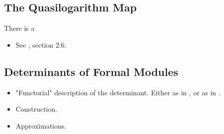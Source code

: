 \documentclass[../main.tex]{subfiles}
\begin{document}


\subsection{The Quasilogarithm Map} %
\label{sub:The Quasilogarithm map}
There is a 
\begin{itemize}
  \item See \cite{BoyarchenkoWeinstein2011MaxVar}, section 2.6.
\end{itemize}

\subsection{Determinants of Formal Modules} %
\label{sub:Determinants of Formal Modules}
\begin{itemize}
  \item "Functorial" description of the determinant. Either as in
    \cite{BoyarchenkoWeinstein2011MaxVar}, or as in \cite{weinstein2016semistable}.
  \item Construction.
  \item Approximations.
\end{itemize}

\end{document}
